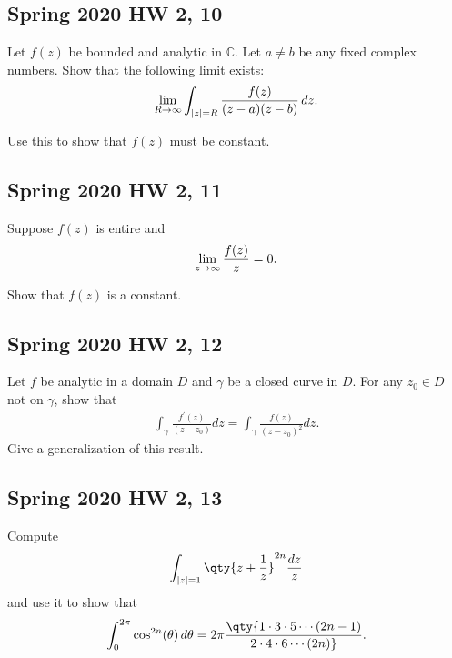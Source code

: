 \hypertarget{spring-2020-hw-2-10}{%
\subsection{Spring 2020 HW 2, 10}\label{spring-2020-hw-2-10}}

Let \(f(z)\) be bounded and analytic in \({\mathbb{C}}\). Let
\(a\neq b\) be any fixed complex numbers. Show that the following limit
exists:
\begin{align*}
\lim_{R\to \infty} \int_{{\left\lvert {z} \right\rvert} = R} {f(z) \over (z-a)(z-b)} \,dz
.\end{align*}

Use this to show that \(f(z)\) must be constant.

\hypertarget{spring-2020-hw-2-11}{%
\subsection{Spring 2020 HW 2, 11}\label{spring-2020-hw-2-11}}

Suppose \(f(z)\) is entire and
\begin{align*}
\lim_{z\to\infty} {f(z) \over z} = 0
.\end{align*}

Show that \(f(z)\) is a constant.

\hypertarget{spring-2020-hw-2-12}{%
\subsection{Spring 2020 HW 2, 12}\label{spring-2020-hw-2-12}}

Let \(f\) be analytic in a domain \(D\) and \(\gamma\) be a closed curve
in \(D\). For any \(z_0\in D\) not on \(\gamma\), show that
\begin{align*}
\int_{\gamma} \frac{f^{\prime}(z)}{\left(z-z_{0}\right)} d z=\int_{\gamma} \frac{f(z)}{\left(z-z_{0}\right)^{2}} d z
.\end{align*}
Give a generalization of this result.

\hypertarget{spring-2020-hw-2-13}{%
\subsection{Spring 2020 HW 2, 13}\label{spring-2020-hw-2-13}}

Compute
\begin{align*}
\int_{{\left\lvert {z} \right\rvert} = 1} \qty{z + {1\over z}}^{2n} {dz \over z}
\end{align*}
and use it to show that
\begin{align*}
\int_0^{2\pi} \cos^{2n}(\theta) \, d\theta = 2\pi \qty{1\cdot 3 \cdot 5 \cdots (2n-1) \over 2 \cdot 4 \cdot 6 \cdots (2n)}
.\end{align*}

